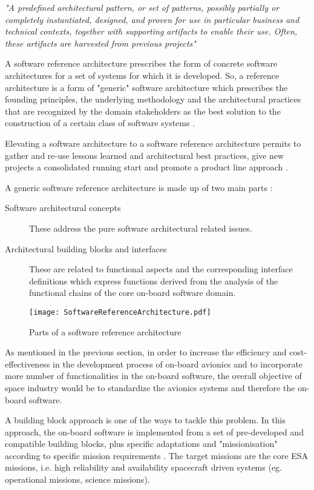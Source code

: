\textit{"A predefined architectural pattern, or set of patterns, possibly partially or
completely instantiated, designed, and proven for use in particular business and technical contexts, together with supporting artifacts to enable their use. Often, these artifacts are harvested
from previous projects"} 

A software reference architecture prescribes the form of concrete software architectures for a set of systems for which it is developed. So, a reference architecture is a form of "generic" software architecture which prescribes the founding principles, the underlying methodology and the architectural practices that are recognized by the domain stakeholders as the best solution to the construction of a certain class of software systems  \cite{PhdThesis}\cite{SoftRefArch}.

Elevating a software architecture to a software reference architecture permits to gather and re-use lessons learned and architectural best practices, give new projects a consolidated running start and promote a product line approach \cite{SAVOIR}.

A generic software reference architecture is made up of two main parts \cite{SAVOIR}:

\begin{description}
\item [Software architectural concepts] These address the pure software architectural related issues.
\item [Architectural building blocks and interfaces] These are related to functional aspects and the corresponding interface definitions which express functions derived from the analysis of the functional chains of the core on-board software domain. 
\end{description}

\begin{figure}[h]
	\centering
	\texttt{[image: SoftwareReferenceArchitecture.pdf]}
	\caption{Parts of a software reference architecture}
	\label{}
\end{figure} 

As mentioned in the previous section, in order to increase the efficiency and cost-effectiveness in the development process of on-board avionics and to incorporate more number of functionalities in the on-board software, the overall objective of space industry would be to standardize the avionics systems and therefore the on-board software.

A building block approach is one of the ways to tackle this problem. In this approach, the on-board software is implemented from a set of pre-developed and compatible building blocks, plus specific adaptations and "missionisation" according to specific mission requirements \cite{SAVOIR}. The target missions are the core ESA missions, i.e. high reliability and availability spacecraft driven systems (eg. operational missions, science missions).

